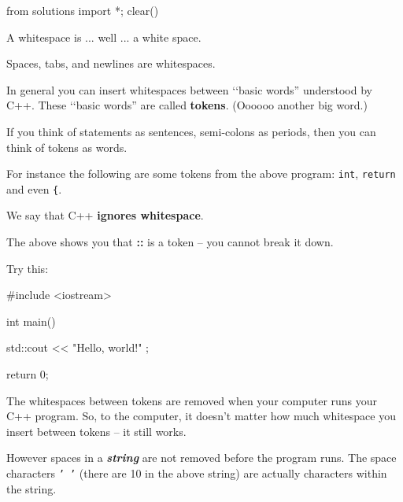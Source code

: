 \begin{python0}
from solutions import *; clear()
\end{python0}

A whitespace is ... well ... a white space.

Spaces, tabs, and newlines are whitespaces.






In general you can insert whitespaces between 
\lq\lq basic words'' understood by C++. 
These \lq\lq basic words'' are called \textbf{tokens}. 
(Oooooo another big word.)

If you think of statements as sentences, 
semi-colons as periods, then you can think of tokens as words.


For instance the following are some tokens from the above program: 
\texttt{int}, \texttt{return} and even \texttt{\{}.

We say that C++ \textbf{ignores whitespace}. 





The above 
shows you that \textbf{::} is a token – you cannot break it down.




Try this:
\begin{console}
#include <iostream>

int main()
{
    std::cout << "Hello,          world!\n" ;

    return 0;
}
\end{console}


The whitespaces between tokens are removed when your computer runs your C++ program. So, to the computer, it doesn't matter how much whitespace you insert between tokens -- it still works.

However spaces in a \textit{\textbf{string}} 
are not removed before the program runs. 
The space characters \texttt{' '}
(there are 10 in the above string) are actually characters within the string.

